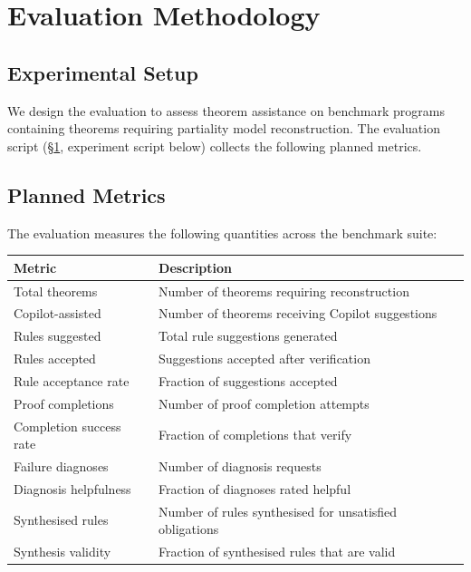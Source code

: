 \documentclass[11pt]{article}
\begin{document}
\section{Evaluation Methodology}\label{sec:eval}

\subsection{Experimental Setup}

We design the evaluation to assess theorem assistance on benchmark
programs containing theorems requiring partiality model reconstruction.
The evaluation script (§\ref{sec:eval}, experiment script below) collects
the following planned metrics.

\subsection{Planned Metrics}

The evaluation measures the following quantities across the benchmark suite:

\begin{center}
\begin{tabular}{lp{8cm}}
\toprule
\textbf{Metric} & \textbf{Description} \\
\midrule
Total theorems          & Number of theorems requiring reconstruction \\
Copilot-assisted        & Number of theorems receiving Copilot suggestions \\
Rules suggested         & Total rule suggestions generated \\
Rules accepted          & Suggestions accepted after verification \\
Rule acceptance rate    & Fraction of suggestions accepted \\
Proof completions       & Number of proof completion attempts \\
Completion success rate & Fraction of completions that verify \\
Failure diagnoses       & Number of diagnosis requests \\
Diagnosis helpfulness   & Fraction of diagnoses rated helpful \\
Synthesised rules       & Number of rules synthesised for unsatisfied obligations \\
Synthesis validity      & Fraction of synthesised rules that are valid \\
\bottomrule
\end{tabular}
\end{center}
\end{document}
